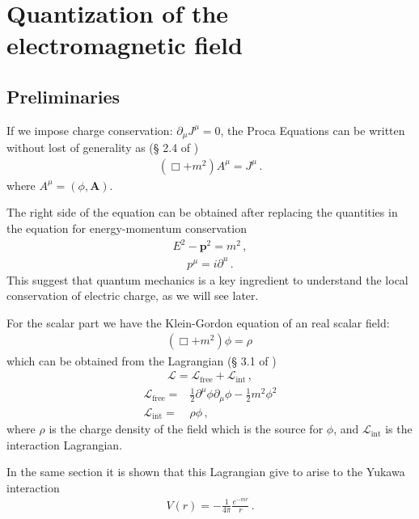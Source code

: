 
\chapter{Quantization of the electromagnetic field}

\section{Preliminaries}

If we impose charge conservation: $\partial_\mu J^\mu=0$, the Proca Equations can be written without lost of generality as (\S{} 2.4 of \cite{lsm})
\begin{align}
  (\Box+m^2)A^\mu=J^\mu\,.
\end{align}
where $A^\mu=(\phi,\mathbf{A})$.

The right side of the equation can be obtained after replacing the quantities in the equation for energy-momentum conservation
\begin{align}
  E^2-\mathbf{p}^2=m^2\,,
\end{align}
\begin{align}
  p^\mu=i\partial^u\,.
\end{align}
This suggest that quantum mechanics is a key ingredient to understand the local conservation of electric charge, as we will see later.


For the scalar part we have the Klein-Gordon equation of an real scalar field:
\begin{align}
   (\Box+m^2)\phi=\rho\,
\end{align}
which can be obtained from the Lagrangian (\S{} 3.1 of \cite{lsm})
\begin{align}
  \mathcal{L}=\mathcal{L}_{\text{free}}+\mathcal{L}_{\text{int}}\,,
\end{align}
\begin{align}
\mathcal{L}_{\text{free}}=&\frac{1}{2}\partial^\mu\phi\partial_\mu\phi-\frac{1}{2}m^2\phi^2\nonumber\\
\mathcal{L}_{\text{int}}=&\rho\phi\,,
\end{align}
where $\rho$ is the charge density of the field which is the source for $\phi$, and $\mathcal{L}_{\text{int}}$ is the interaction Lagrangian.

In the same section it is shown that this Lagrangian give to arise to the Yukawa interaction
\begin{align}
  V(r)=-\frac{1}{4\pi}\frac{e^{-m r}}{r}\,.
\end{align}

